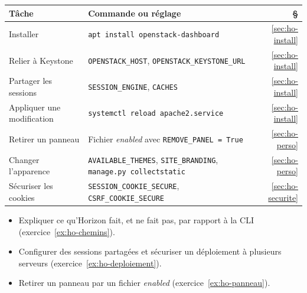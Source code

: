 \begin{center}
\renewcommand{\arraystretch}{1.35}
\begin{tabular}{@{}>{\raggedright\arraybackslash}p{4.2cm}>{\raggedright\arraybackslash}p{9.9cm}r@{}}
\toprule
\textbf{Tâche} & \textbf{Commande ou réglage} & \textbf{§} \\
\midrule
Installer & \texttt{apt install openstack-dashboard} & \ref{sec:ho-install} \\
Relier à Keystone & \texttt{OPENSTACK\_\allowbreak HOST}, \texttt{OPENSTACK\_\allowbreak KEYSTONE\_\allowbreak URL} & \ref{sec:ho-install} \\
Partager les sessions & \texttt{SESSION\_\allowbreak ENGINE}, \texttt{CACHES} & \ref{sec:ho-install} \\
Appliquer une modification & \texttt{systemctl reload apache2.service} & \ref{sec:ho-install} \\
Retirer un panneau & Fichier \emph{enabled} avec \texttt{REMOVE\_\allowbreak PANEL = True} & \ref{sec:ho-perso} \\
Changer l'apparence & \texttt{AVAILABLE\_\allowbreak THEMES}, \texttt{SITE\_\allowbreak BRANDING}, \texttt{manage.py collectstatic} & \ref{sec:ho-perso} \\
Sécuriser les cookies & \texttt{SESSION\_\allowbreak COOKIE\_\allowbreak SECURE}, \texttt{CSRF\_\allowbreak COOKIE\_\allowbreak SECURE} & \ref{sec:ho-securite} \\
\bottomrule
\end{tabular}
\end{center}

\begin{savoirfaire}
\begin{itemize}
  \item Expliquer ce qu'Horizon fait, et ne fait pas, par rapport à la CLI (exercice~\ref{ex:ho-chemins}).
  \item Configurer des sessions partagées et sécuriser un déploiement à plusieurs serveurs (exercice~\ref{ex:ho-deploiement}).
  \item Retirer un panneau par un fichier \emph{enabled} (exercice~\ref{ex:ho-panneau}).
\end{itemize}
\end{savoirfaire}
